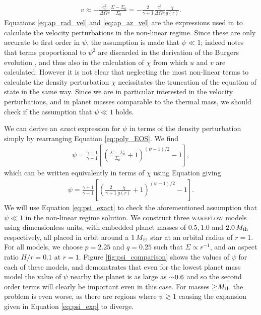 \begin{align}
    v \approx - \frac{c_0^2}{\Delta \Omega r} \frac{\Sigma - \Sigma_0}{\Sigma_0} = - \frac{2}{\gamma + 1} \frac{c_0^2}{\Delta \Omega r} \frac{\chi}{g(r)}. \label{eq:ap_az_vel}
\end{align}
Equations \ref{eq:ap_rad_vel} and \ref{eq:ap_az_vel} are the expressions used in \citet{bollati2021} to calculate the velocity perturbations in the non-linear regime. 
Since these are only accurate to first order in $\psi$, the assumption is made that $\psi \ll 1$; indeed \citet{bollati2021} notes that terms proportional to $\psi^2$ are discarded in the derivation of the Burgers evolution \feqr, and thus also in the calculation of $\chi$ from which $u$ and $v$ are calculated. 
However it is not clear that neglecting the most non-linear terms to calculate the density perturbation $\chi$ necissitates the truncation of the equation of state in the same way. 
Since we are in particular interested in the velocity perturbations, and in planet masses comparable to the thermal mass, we should check if the assumption that $\psi \ll 1$ holds.

We can derive an \textit{exact} expression for $\psi$ in terms of the density perturbation simply by rearranging Equation \ref{eq:poly_EOS}. We find
\begin{align}
    \psi = \frac{\gamma + 1}{\gamma - 1} \left[ \left( \frac{\Sigma-\Sigma_0}{\Sigma_0} +1  \right)^{(\psi-1)/2}  -1 \right],
\end{align}
which can be written equivalently in terms of $\chi$ using Equation \feqr giving
\begin{align}
    \psi = \frac{\gamma + 1}{\gamma - 1} \left[ \left( \frac{2}{\gamma + 1} \frac{\chi}{g(r)} +1  \right)^{(\psi-1)/2} -1 \right]. \label{eq:psi_exact}
\end{align}
We will use Equation \ref{eq:psi_exact} to check the aforementioned assumption that $\psi \ll 1$ in the non-linear regime solution. 
We construct three \textsc{wakeflow} models using dimensionless units, with embedded planet masses of $0.5, 1.0$ and $2.0 \, M_{\rm{th}}$ respectively, all placed in orbit around a $1 \, M_{\rm{\odot}}$ star at an orbital radius of $r=1$. 
For all models, we choose $p=2.25$ and $q=0.25$ such that $\Sigma \propto r^{-1}$, and an aspect ratio $H/r=0.1$ at $r=1$. 
Figure \ref{fig:psi_comparison} shows the values of $\psi$ for each of these models, and demonstrates that even for the lowest planet mass model the value of $\psi$ nearby the planet is as large as $\sim \hspace{-0.23em} 0.6$ and so the second order terms will clearly be important even in this case. 
For masses $\ge \hspace{-0.23em} M_\mathrm{th}$ the problem is even worse, as there are regions where $\psi \gtrsim 1$ causing the expansion given in Equation \ref{eq:psi_exp} to diverge.

